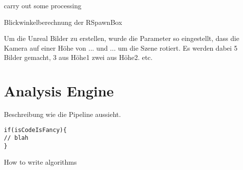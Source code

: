 \begin{algorithm}[H]
\begin{algorithmic}
\STATE carry out some processing
\ENDFOR
\end{algorithmic}
\caption{Blickwinkelberechnung der RSpawnBox}
\end{algorithm}

 \par

Um die Unreal Bilder zu erstellen, wurde die Parameter so eingestellt, dass die Kamera auf einer Höhe von ... und ... um die Szene rotiert. Es werden dabei 5 Bilder gemacht, 3 aus Höhe1 zwei aus Höhe2. etc.    

\section{Analysis Engine}
\label{sec:analysisengine}
Beschreibung wie die Pipeline aussieht.


\begin{algorithm}[H]
\begin{lstlisting}
if(isCodeIsFancy){
// blah
}
\end{lstlisting}
 \caption{How to write algorithms}
\end{algorithm}
